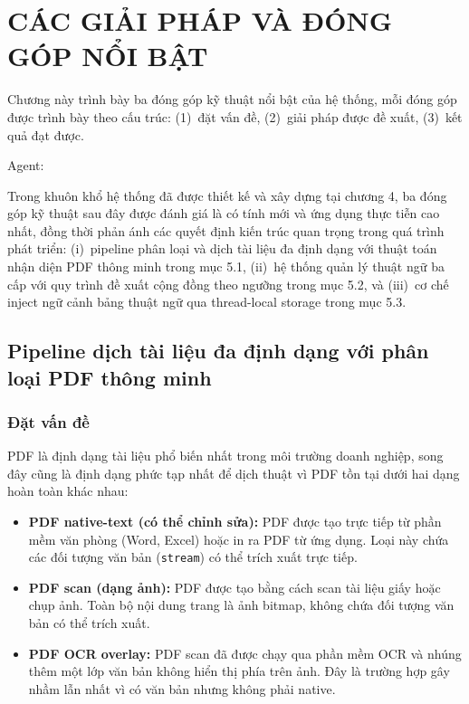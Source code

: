 \chapter{CÁC GIẢI PHÁP VÀ ĐÓNG GÓP NỔI BẬT}

Chương này trình bày ba đóng góp kỹ thuật nổi bật của hệ thống, mỗi đóng góp được trình bày
theo cấu trúc: (1)~đặt vấn đề, (2)~giải pháp được đề xuất, (3)~kết quả đạt được.

Agent:

Trong khuôn khổ hệ thống đã được thiết kế và xây dựng tại chương 4, ba đóng góp kỹ thuật sau đây được đánh giá là có tính mới và ứng dụng thực tiễn cao nhất, đồng thời phản ánh các quyết định kiến trúc quan trọng trong quá trình phát triển: (i)~pipeline phân loại và dịch tài liệu đa định dạng với thuật toán nhận diện PDF thông minh trong mục 5.1, (ii)~hệ thống quản lý thuật ngữ ba cấp với quy trình đề xuất cộng đồng theo ngưỡng trong mục 5.2, và (iii)~cơ chế inject ngữ cảnh bảng thuật ngữ qua thread-local storage trong mục 5.3.

\section{Pipeline dịch tài liệu đa định dạng với phân loại PDF thông minh}

\subsection{Đặt vấn đề}

PDF là định dạng tài liệu phổ biến nhất trong môi trường doanh nghiệp, song đây cũng là định
dạng phức tạp nhất để dịch thuật vì PDF tồn tại dưới hai dạng hoàn toàn khác nhau:

\begin{itemize}
  \item \textbf{PDF native-text (có thể chỉnh sửa):} PDF được tạo trực tiếp từ phần mềm văn
    phòng (Word, Excel) hoặc in ra PDF từ ứng dụng. Loại này chứa các đối tượng văn bản
    (\texttt{stream}) có thể trích xuất trực tiếp.
  \item \textbf{PDF scan (dạng ảnh):} PDF được tạo bằng cách scan tài liệu giấy hoặc chụp ảnh.
    Toàn bộ nội dung trang là ảnh bitmap, không chứa đối tượng văn bản có thể trích xuất.
  \item \textbf{PDF OCR overlay:} PDF scan đã được chạy qua phần mềm OCR và nhúng thêm một lớp
    văn bản không hiển thị phía trên ảnh. Đây là trường hợp gây nhầm lẫn nhất vì có văn bản
    nhưng không phải native.
\end{itemize}

